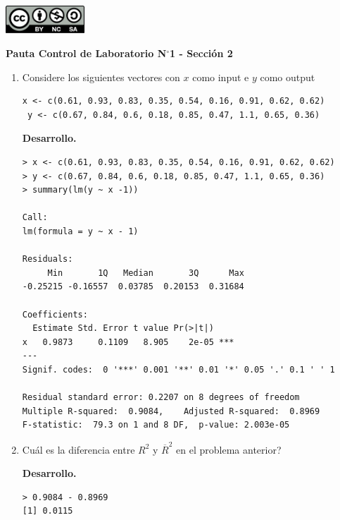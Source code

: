 \documentclass[11pt,oneside,spanish]{article}
\theoremstyle{definition}
\theoremstyle{definition}\newtheorem{definicion}{Definicin}
\theoremstyle{definition}\newtheorem{ejemplo}{Ejemplo}
\theoremstyle{remark}\newtheorem{nota}{\textsc{Nota}}
\theoremstyle{definition}\newtheorem{proposicion}{Proposicin}
\theoremstyle{definition}\newtheorem{problema}{Problema}
\begin{document}
\thispagestyle{fancy}

\includegraphics[width=8em]{by-nc-sa.pdf}

\begin{center}
\textbf{Pauta Control de Laboratorio N$^\circ$1  - Secci\'on 2} 
\end{center}

\bigskip

\begin{enumerate}[(1)]

\item Considere los siguientes vectores con $x$ como input e $y$ como output
\begin{lstlisting}[backgroundcolor=\color{Gray!20},frame=none,basicstyle=\ttfamily]
 x <- c(0.61, 0.93, 0.83, 0.35, 0.54, 0.16, 0.91, 0.62, 0.62)
 y <- c(0.67, 0.84, 0.6, 0.18, 0.85, 0.47, 1.1, 0.65, 0.36)
\end{lstlisting}

\textbf{Desarrollo.}
\begin{lstlisting}[backgroundcolor=\color{Gray!20},frame=none,basicstyle=\ttfamily]
> x <- c(0.61, 0.93, 0.83, 0.35, 0.54, 0.16, 0.91, 0.62, 0.62)
> y <- c(0.67, 0.84, 0.6, 0.18, 0.85, 0.47, 1.1, 0.65, 0.36)
> summary(lm(y ~ x -1))

Call:
lm(formula = y ~ x - 1)

Residuals:
     Min       1Q   Median       3Q      Max 
-0.25215 -0.16557  0.03785  0.20153  0.31684 

Coefficients:
  Estimate Std. Error t value Pr(>|t|)    
x   0.9873     0.1109   8.905    2e-05 ***
---
Signif. codes:  0 '***' 0.001 '**' 0.01 '*' 0.05 '.' 0.1 ' ' 1

Residual standard error: 0.2207 on 8 degrees of freedom
Multiple R-squared:  0.9084,	Adjusted R-squared:  0.8969 
F-statistic:  79.3 on 1 and 8 DF,  p-value: 2.003e-05
\end{lstlisting}

	
\item {\textquestiondown}Cu\'al es la diferencia entre $R^2$ y $\overline{R}^2$ en el problema anterior?

\textbf{Desarrollo.}
\begin{lstlisting}[backgroundcolor=\color{Gray!20},frame=none,basicstyle=\ttfamily]
> 0.9084 - 0.8969
[1] 0.0115
\end{lstlisting}



\end{enumerate}
\end{document}
